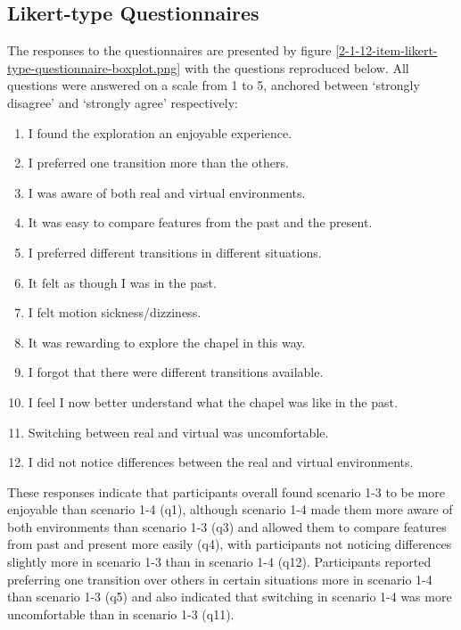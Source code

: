 
\subsection{Likert-type Questionnaires}
The responses to the questionnaires are presented by figure \ref{2-1-12-item-likert-type-questionnaire-boxplot.png} with the questions reproduced below. All questions were answered on a scale from 1 to 5, anchored between `strongly disagree' and `strongly agree' respectively:
\begin{enumerate}
	\item I found the exploration an enjoyable experience.
	\item I preferred one transition more than the others.
	\item I was aware of both real and virtual environments.
	\item It was easy to compare features from the past and the present.
	\item I preferred different transitions in different situations.
	\item It felt as though I was in the past.
	\item I felt motion sickness/dizziness.
	\item It was rewarding to explore the chapel in this way.
	\item I forgot that there were different transitions available.
	\item I feel I now better understand what the chapel was like in the past.
	\item Switching between real and virtual was uncomfortable.
	\item I did not notice differences between the real and virtual environments.
\end{enumerate}

These responses indicate that participants overall found scenario 1-3 to be more enjoyable than scenario 1-4 (q1), although scenario 1-4 made them more aware of both environments than scenario 1-3 (q3) and allowed them to compare features from past and present more easily (q4), with participants not noticing differences slightly more in scenario 1-3 than in scenario 1-4 (q12). Participants reported preferring one transition over others in certain situations more in scenario 1-4 than scenario 1-3 (q5) and also indicated that switching in scenario 1-4 was more uncomfortable than in scenario 1-3 (q11).

